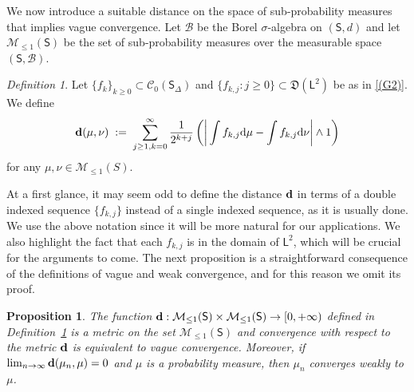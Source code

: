 \documentclass[12pt,a4paper]{article}
\theoremstyle{plain}
\newtheorem{proposition}[theorem]{Proposition}
\theoremstyle{remark}
\newtheorem{definition}[theorem]{Definition}
\newcommand{\dd}{\text{\rm d}}
\newcommand{\msf}[1]{{\mathsf #1}}
\newcommand{\mc}[1]{{\mathcal #1}}
\newcommand{\mf}[1]{{\mathfrak #1}}
\begin{document}
	
	We now  introduce a suitable distance
	on the space of sub-probability measures that implies vague convergence.
	Let $\mc{B}$ be the Borel $\sigma$-algebra on $(\msf{S},d)$ and let $\mc M_{\leq 1}(\msf{S})$ be the set of sub-probability measures over the measurable space $(\msf{S}, \mc{B})$.
	\begin{definition}\label{def:metric}
		Let $\{f_{k}\}_{k \geq 0}\subset\mc{C}_0(\msf S_\Delta)$ and $\{f_{k,j}:j \geq 0\} \subset \mf{D}(\msf{L}^2)$ be as in \ref{(G2)}. We define
		\begin{equation*}
			{\bf d}(\mu,\nu)\;:=\; \sum_{j\geq 1,k=0}^\infty \frac{1}{2^{k+j}}\left(\bigg\vert \int f_{k,j}\dd \mu - \int f_{k,j}\dd \nu\bigg\vert \wedge 1\right)
		\end{equation*}
		for any $\mu, \nu\in \mc M_{\leq 1}(S)$.
	\end{definition}
	
	At a first glance, it may seem odd to define the distance ${\bf d}$ in terms of a double indexed sequence $\{f_{k,j}\}$ instead of a single indexed sequence, as it is usually done. We use the above notation since it will be more natural for our applications.
	We also highlight the fact that each $f_{k,j}$ is in the domain of $\msf L^2$, which will be crucial for the arguments to come.
	The next proposition is a straightforward consequence of the definitions of vague and weak convergence, and for this reason we omit its proof.
	\begin{proposition}
		The function ${\bf d}: \mc{M}_{\leq 1}(\msf S) \times \mc{M}_{\leq 1}(\msf S)\to [0,+\infty)$ defined in Definition~\ref{def:metric} is a metric on the set
		$\mc{M}_{\leq 1}(\msf S)$ and convergence with respect to  the metric $\bf d$ is equivalent to vague convergence. Moreover, if $\lim_{n\to\infty}{\bf d}(\mu_n,\mu)=0$ and  $\mu$ is a probability measure, then $\mu_n$ converges weakly to $\mu$.
	\end{proposition}
	
	
	
\end{document}
